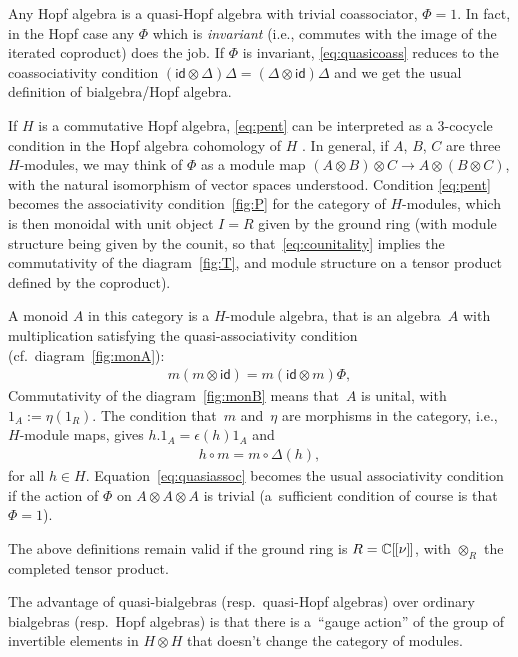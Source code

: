 \documentclass[10pt,a4paper]{amsart}
\numberwithin{equation}{section}
\theoremstyle{definition}
\newcommand{\C}{\mathbb{C}}
\newcommand{\id}{\mathsf{id}}
\newcommand{\lbrak}{[\hspace{-0.5pt}[}
\newcommand{\rbrak}{]\hspace{-0.5pt}]}
\renewcommand{\hbar}{\nu}
\begin{document}
Any Hopf algebra is a quasi-Hopf algebra with trivial coassociator, $\Phi=1$. In fact, in the Hopf case any $\Phi$ which is \emph{invariant} (i.e., commutes with the image of the iterated coproduct) does the job. If $\Phi$ is invariant,
\eqref{eq:quasicoass} reduces to the coassociativity condition $(\id\otimes\Delta)\Delta=(\Delta\otimes\id)\Delta$ and we get the usual def\/inition of bialgebra/Hopf algebra.

If $H$ is a commutative Hopf algebra, \eqref{eq:pent} can be interpreted as a $3$-cocycle condition in the Hopf algebra cohomology of $H$ \cite[Section~2.3]{Maj95}. In general, if $A$, $B$, $C$ are three $H$-modules, we may think of $\Phi$ as a module map $(A\otimes B)\otimes C\to A\otimes (B\otimes C)$, with the natural isomorphism of vector spaces understood. Condition \eqref{eq:pent} becomes the associativity condition~\ref{fig:P} for the category of $H$-modules, which is then monoidal with unit object $I=R$ given by the ground ring
(with module structure being given by the counit, so that~\eqref{eq:counitality} implies the commutativity of the diagram~\ref{fig:T}, and module structure on a tensor product def\/ined by the coproduct).

A monoid $A$ in this category is a $H$-module algebra, that is an algebra~$A$ with multiplication satisfying the quasi-associativity condition (cf.~diagram~\ref{fig:monA}):
\begin{gather}\label{eq:quasiassoc}
m(m\otimes\id)=m(\id\otimes m)\Phi ,
\end{gather}
Commutativity of the diagram~\ref{fig:monB} means that~$A$ is unital, with $1_A:=\eta(1_R)$. The condition that~$m$ and~$\eta$ are morphisms in the category, i.e., $H$-module maps, gives $h.1_A=\epsilon(h)1_A$ and
\begin{gather*}
h\circ m=m\circ \Delta(h) ,
\end{gather*}
for all $h\in H$. Equation~\eqref{eq:quasiassoc} becomes the usual associativity condition if the action of $\Phi$ on $A\otimes A\otimes A$ is trivial (a~suf\/f\/icient condition of course is that $\Phi=1$).

The above def\/initions remain valid if the ground ring is $R=\C\lbrak\hbar\rbrak$, with $\otimes_R$ the completed tensor product.

The advantage of quasi-bialgebras (resp.~quasi-Hopf algebras) over ordinary bialgebras (resp.\ Hopf algebras) is that there is a~``gauge action'' of the group of invertible elements in $H\otimes H$ that doesn't change the category of modules.
\end{document}
